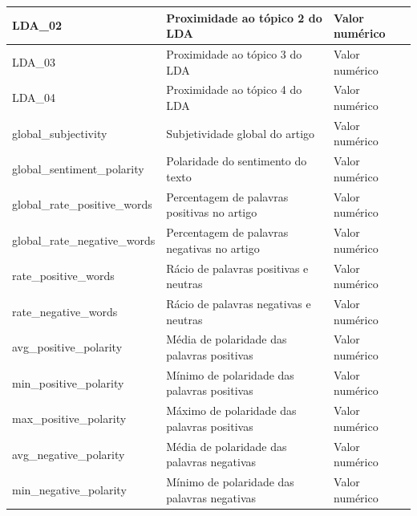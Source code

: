 \begin{table}
{\begin{tabular}{|l|l|l|}
LDA\_02                          & Proximidade ao tópico 2 do LDA                                                                & Valor numérico \\ \hline
LDA\_03                          & Proximidade ao tópico 3 do LDA                                                                & Valor numérico \\ \hline
LDA\_04                          & Proximidade ao tópico 4 do LDA                                                                & Valor numérico \\ \hline
global\_subjectivity             & Subjetividade global do artigo                                                                & Valor numérico \\ \hline
global\_sentiment\_polarity      & Polaridade do sentimento do texto                                                             & Valor numérico \\ \hline
global\_rate\_positive\_words    & Percentagem de palavras positivas no artigo                                                   & Valor numérico \\ \hline
global\_rate\_negative\_words    & Percentagem de palavras negativas no artigo                                                   & Valor numérico \\ \hline
rate\_positive\_words            & Rácio de palavras positivas e neutras                                                         & Valor numérico \\ \hline
rate\_negative\_words            & Rácio de palavras negativas e neutras                                                         & Valor numérico \\ \hline
avg\_positive\_polarity          & Média de polaridade das palavras positivas                                                    & Valor numérico \\ \hline
min\_positive\_polarity          & Mínimo de polaridade das palavras positivas                                                   & Valor numérico \\ \hline
max\_positive\_polarity          & Máximo de polaridade das palavras positivas                                                   & Valor numérico \\ \hline
avg\_negative\_polarity          & Média de polaridade das palavras negativas                                                    & Valor numérico \\ \hline
min\_negative\_polarity          & Mínimo de polaridade das palavras negativas                                                   & Valor numérico \\ \hline

\end{tabular}}
\end{table}
